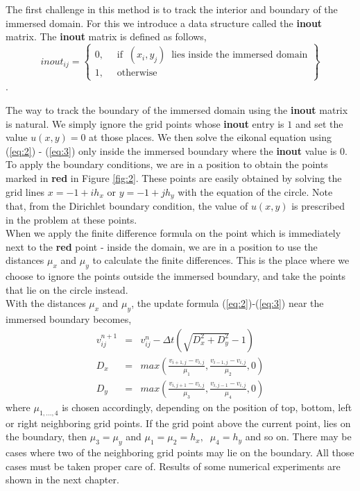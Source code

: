 \documentclass[11pt]{report}
\begin{document}
\noindent
The first challenge in this method is to track the interior and boundary of the 
immersed domain. For this we introduce a data structure called the \textbf{inout} matrix. The \textbf{inout} matrix is defined as follows,
\begin{equation}
	inout_{ij} = 
	\begin{Bmatrix}
	0, &\;\; \text{if} \;\; (x_i,y_j) \;\; \text{lies inside the immersed domain}\\
	1, &\;\; \text{otherwise}
	\end{Bmatrix}
\end{equation}.

\noindent
The way to track the boundary of the immersed domain using the \textbf{inout} matrix is natural. We simply ignore the grid points whose \textbf{inout} entry is $1$ and set the value $u(x,y) = 0$ at those places. We then solve the eikonal equation using (\ref{eq:2}) - (\ref{eq:3}) only inside the immersed boundary where the \textbf{inout} value is $0$.\\

\noindent
To apply the boundary conditions, we are in a position to obtain the points marked in \textbf{red} in Figure \ref{fig:2}. These points are easily obtained by solving the grid lines $x = -1 + ih_x$ or $y = -1 + jh_y$ with the equation of the circle. Note that, from the Dirichlet boundary condition, the value of $u(x,y)$ is prescribed in the problem at these points. \\

\noindent
When we apply the finite difference formula on the point which is immediately next to the \textbf{red} point - inside the domain, we are in a position to use the distances $\mu_x$ and $\mu_y$ to calculate the finite differences. This is the place where we choose to ignore the points outside the immersed boundary, and take the points that lie on the circle instead.\\

\noindent
With the distances $\mu_x$ and $\mu_y$, the update formula (\ref{eq:2})-(\ref{eq:3}) near the immersed boundary becomes,
\begin{eqnarray}
	v_{ij}^{n+1} &=& v_{ij}^n - \Delta t\left(\sqrt{D_x^2 + D_y^2}-1\right)\\ 
	D_x &=& max\left(\frac{v_{i+1,j}-v_{i,j}}{\mu_1},\frac{v_{i-1,j}-v_{i,j}}{\mu_2},0\right)\\
	D_y &=& max\left(\frac{v_{i,j+1}-v_{i,j}}{\mu_3},\frac{v_{i,j-1}-v_{i,j}}{\mu_4},0\right)
\end{eqnarray}
where $\mu_{1,\dots,4}$ is chosen accordingly, depending on the position of top, bottom, left or right neighboring grid points. If the grid point above the current point, lies on the boundary, then $\mu_3 = \mu_y$ and $\mu_1 =  \mu_2 = h_x, \;\; \mu_4 = h_y$ and so on. There may be cases where two of the neighboring grid points may lie on the boundary. All those cases must be taken proper care of. Results of some numerical experiments are shown in the next chapter.
\end{document}
